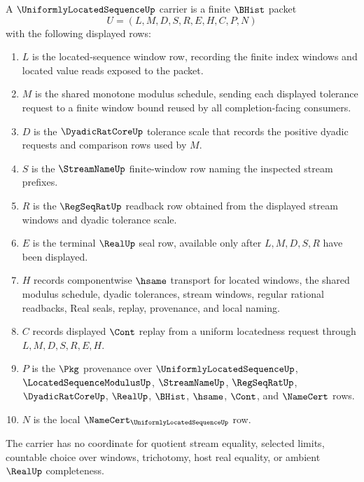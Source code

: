 \begin{definition}
\label{def:uniformly-located-sequence-carrier}
A $\UniformlyLocatedSequenceUp$ carrier is a finite $\BHist$ packet
$$
U=(L,M,D,S,R,E,H,C,P,N)
$$
with the following displayed rows:
\begin{enumerate}
\item $L$ is the located-sequence window row, recording the finite index windows and located value reads exposed to the packet.
\item $M$ is the shared monotone modulus schedule, sending each displayed tolerance request to a finite window bound reused by all completion-facing consumers.
\item $D$ is the $\DyadicRatCoreUp$ tolerance scale that records the positive dyadic requests and comparison rows used by $M$.
\item $S$ is the $\StreamNameUp$ finite-window row naming the inspected stream prefixes.
\item $R$ is the $\RegSeqRatUp$ readback row obtained from the displayed stream windows and dyadic tolerance scale.
\item $E$ is the terminal $\RealUp$ seal row, available only after $L,M,D,S,R$ have been displayed.
\item $H$ records componentwise $\hsame$ transport for located windows, the shared modulus schedule, dyadic tolerances, stream windows, regular rational readbacks, Real seals, replay, provenance, and local naming.
\item $C$ records displayed $\Cont$ replay from a uniform locatedness request through $L,M,D,S,R,E,H$.
\item $P$ is the $\Pkg$ provenance over $\UniformlyLocatedSequenceUp$, $\LocatedSequenceModulusUp$, $\StreamNameUp$, $\RegSeqRatUp$, $\DyadicRatCoreUp$, $\RealUp$, $\BHist$, $\hsame$, $\Cont$, and $\NameCert$ rows.
\item $N$ is the local $\NameCert_{\UniformlyLocatedSequenceUp}$ row.
\end{enumerate}
The carrier has no coordinate for quotient stream equality, selected limits, countable choice over windows, trichotomy, host real equality, or ambient $\RealUp$ completeness.
\end{definition}

